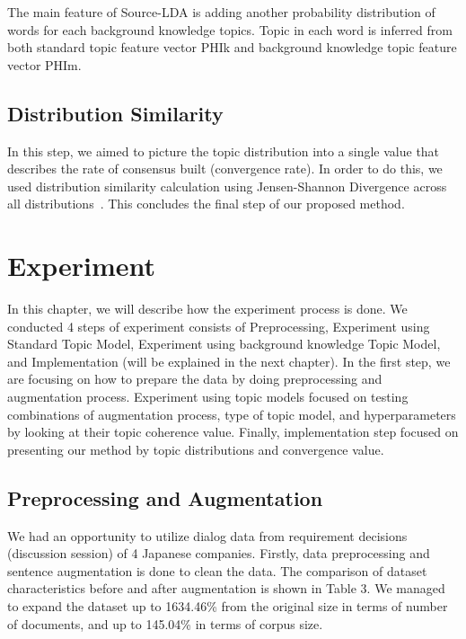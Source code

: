 \documentclass[senior]{IPSstyle}
\begin{document}
The main feature of Source-LDA is adding another probability distribution of words for each background knowledge topics. Topic in each word is inferred from both standard topic feature vector PHIk and background knowledge topic feature vector PHIm.

\section{Distribution Similarity}

In this step, we aimed to picture the topic distribution into a single value that describes the rate of consensus built (convergence rate). In order to do this, we used distribution similarity calculation using Jensen-Shannon Divergence across all distributions~\cite{aslam}. This concludes the final step of our proposed method.

\chapter{Experiment} 

In this chapter, we will describe how the experiment process is done. We conducted 4 steps of experiment consists of Preprocessing, Experiment using Standard Topic Model, Experiment using background knowledge Topic Model, and Implementation (will be explained in the next chapter). In the first step, we are focusing on how to prepare the data by doing preprocessing and augmentation process. Experiment using topic models focused on testing combinations of augmentation process, type of topic model, and hyperparameters by looking at their topic coherence value. Finally, implementation step focused on presenting our method by topic distributions and convergence value.

\section{Preprocessing and Augmentation}

We had an opportunity to utilize dialog data from requirement decisions (discussion session) of 4 Japanese companies. Firstly, data preprocessing and sentence augmentation is done to clean the data. The comparison of dataset characteristics before and after augmentation is shown in Table 3. We managed to expand the dataset up to 1634.46\% from the original size in terms of number of documents, and up to 145.04\% in terms of corpus size.
\end{document}
